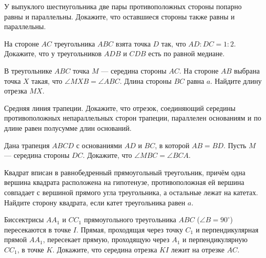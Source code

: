 \documentclass{article}
\begin{document}
\begin{enumerate_boxed}
        \item У выпуклого шестиугольника две пары противоположных стороны попарно равны и параллельны.
        Докажите, что оставшиеся стороны также равны и параллельны.

        \item На стороне $AC$ треугольника $ABC$ взята точка $D$ так, что $AD:DC=1:2$.
        Докажите, что у треугольников $ADB$ и $CDB$ есть по равной медиане.

        \item В треугольнике $ABC$ точка $M$ — середина стороны $AC$.
        На стороне $AB$ выбрана точка $X$ такая, что $\angle MXB=\angle ABC$.
        Длина стороны $BC$ равна $a$.
        Найдите длину отрезка $MX$.

        \item Средняя линия трапеции.
        Докажите, что отрезок, соединяющий середины противоположных непараллельных сторон трапеции, параллелен основаниям и по длине равен полусумме длин оснований.

        \item Дана трапеция $ABCD$ с основаниями $AD$ и $BC$, в которой $AB=BD$.
        Пусть $M$ — середина стороны $DC$.
        Докажите, что $\angle MBC=\angle BCA$.

        \item Квадрат вписан в равнобедренный прямоугольный треугольник, причём одна вершина квадрата расположена на гипотенузе, противоположная ей вершина совпадает с вершиной прямого угла треугольника, а остальные лежат на катетах.
        Найдите сторону квадрата, если катет треугольника равен $a$.

        \item Биссектрисы $AA_1$ и $CC_1$ прямоугольного треугольника $ABC$ ($\angle B=90^\circ$) пересекаются в точке $I$.
        Прямая, проходящая через точку $C_1$ и перпендикулярная прямой $AA_1$, пересекает прямую, проходящую через $A_1$ и перпендикулярную $CC_1$, в точке $K$.
        Докажите, что середина отрезка $KI$ лежит на отрезке $AC$.
        
    \end{enumerate_boxed}
\end{document}
